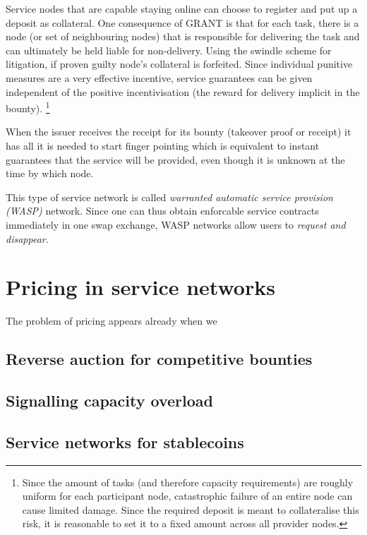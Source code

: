\documentclass[a4paper,10pt]{article}
\newcommand\gloss[1]{\emph{\gls{#1}}}
\begin{document}
Service nodes that are capable staying online can choose to register
and put up a deposit as collateral.
One consequence of GRANT is that for each task, there is a node (or set of neighbouring nodes)
that is responsible for delivering the task and can ultimately be held liable
for non-delivery. Using the swindle scheme for litigation, if proven guilty node's
collateral is forfeited.
Since individual punitive measures are a very
effective incentive, service guarantees can be given independent of the
positive incentivisation (the reward for delivery implicit in the bounty).%
%
\footnote{Since the amount of tasks (and therefore capacity requirements) are roughly uniform for each
participant node, catastrophic failure of an entire node can cause limited damage.
Since the required deposit is meant to collateralise this risk, it is reasonable to
set it to a fixed amount across all provider nodes.}

When the issuer receives the receipt for its bounty (takeover proof or receipt)
it has all it is needed to start finger pointing which is equivalent to
instant guarantees that the service will be provided,
even though it is unknown at the time by which node.

This type of service network is called \gloss{warranted automatic service provision (WASP)} network.
Since one can thus obtain enforcable service contracts immediately
in one swap exchange, WASP networks allow users to \emph{request and disappear}.

\section{Pricing in service networks}

The problem of pricing appears already when we

\subsection{Reverse auction for competitive bounties}
\subsection{Signalling capacity overload}
\subsection{Service networks for stablecoins}

\cite{btcmicro2014}
\cite{decker2015fast}
\cite{poon2015bitcoin}  %
\cite{prihodko2016flare} %
\cite{tremback2015universal}  %
\cite{bonneau2014mixcoin} %
\cite{ethersphere2016sw3}
\cite{ethersphere2016smash}
\cite{maymounkov2002kademlia}
\cite{heep2010r}
\cite{malavolta2017concurrency}
\cite{chiesa2017decentralized}
\cite{heilman2016tumblebit}
\cite{green2016bolt}
\cite{miller2017sprites}
\cite{mcdonald2017payment}
\cite{diferrante2017payment}
\end{document}
